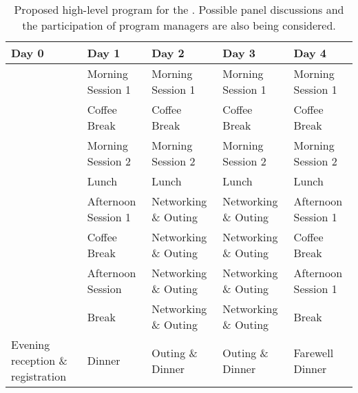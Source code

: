 \begin{table}[!t]
  \centering
  \begin{tabular}{|p{2.5cm}|p{2.5cm}|p{2.5cm}|p{2.5cm}|p{2.5cm}|}
    \hline 
    \rowcolor{Gray}
    \bfseries Day 0& \bfseries Day 1&\bfseries Day 2 &\bfseries Day 3 &\bfseries Day 4\\
    \hline
                   &Morning Session 1&Morning Session 1&Morning Session 1&Morning Session 1\\
    \hline
                   &Coffee Break&Coffee Break&Coffee Break&Coffee Break\\
    \hline    
                   &Morning Session 2&Morning Session 2&Morning Session 2&Morning Session 2\\
    \hline
                   &Lunch&Lunch&Lunch&Lunch\\
    \hline
                   &Afternoon Session 1&Networking \& Outing&Networking \& Outing&Afternoon Session 1\\
    \hline
                   &Coffee Break&Networking \& Outing&Networking \& Outing&Coffee Break\\
    \hline
                   &Afternoon Session &Networking \& Outing&Networking \& Outing&Afternoon Session 1\\
    \hline
                   &Break&Networking \& Outing&Networking \& Outing&Break\\
    \hline
    Evening reception \& registration&Dinner&Outing \& Dinner&Outing \&
                                                               Dinner&Farewell Dinner\\
    \hline        
  \end{tabular}
  \caption{Proposed high-level program for the \sympe. Possible panel
    discussions and the participation of program managers are also
    being considered.}
  \label{tab:symp}
\end{table}
